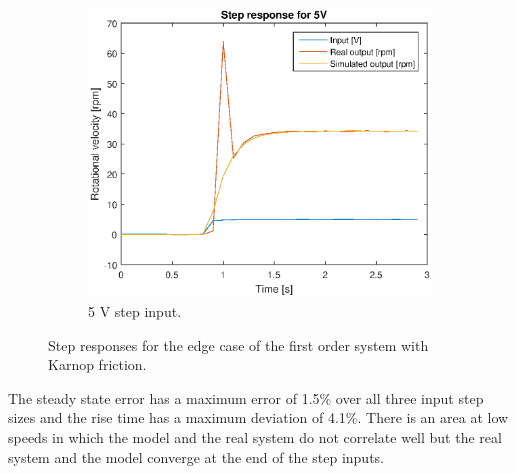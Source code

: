 \begin{figure}[H]
\begin{subfigure}[H]{0.48\textwidth}
    \includegraphics[width=\textwidth]{./img/testrig_5Vstep_no_i_fric.eps}
    \caption{5 V step input.}\label{fig:5vkarnop}
    \end{subfigure}
    \caption{Step responses for the edge case of the first order system with
    Karnop friction.}
\end{figure}
The steady state error has a maximum error of 1.5\% over all three input step
sizes and the rise time has a maximum deviation of 4.1\%. There is
an area at low speeds in which the model and the real system do not correlate
well but the real system and the model converge at the end of the step inputs. 

